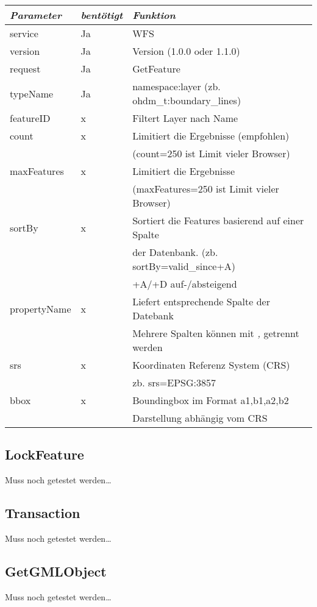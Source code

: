 \begin{tabular}{lll}
\emph{Parameter} & \emph{bentötigt} & \emph{Funktion} \\
\hline
service	& Ja & 	 WFS\\
\hline
version	& Ja &	 Version (1.0.0 oder 1.1.0)\\
\hline
request	& Ja &	GetFeature\\
\hline
typeName	& Ja &	namespace:layer (zb. ohdm\_t:boundary\_lines)\\
\hline
featureID & x & Filtert Layer nach Name\\
\hline
count & x & Limitiert die Ergebnisse (empfohlen)\\&& (count=250 ist Limit vieler Browser)\\
\hline
maxFeatures & x & Limitiert die Ergebnisse \\&&(maxFeatures=250 ist Limit vieler Browser)\\
\hline
sortBy & x & Sortiert die Features basierend auf einer Spalte \\&&der Datenbank. (zb. sortBy=valid\_since+A)\\&& +A/+D auf-/absteigend\\
\hline
propertyName & x & Liefert entsprechende Spalte der Datebank\\&&Mehrere Spalten können mit \emph{,} getrennt werden\\
\hline
srs & x & Koordinaten Referenz System (CRS)\\&& zb. srs=EPSG:3857\\
\hline
bbox & x& Boundingbox im Format a1,b1,a2,b2\\&& Darstellung abhängig vom CRS\\
\end{tabular}

\subsection*{LockFeature}
Muss noch getestet werden\ldots
\subsection*{Transaction}
Muss noch getestet werden\ldots
\subsection*{GetGMLObject}
Muss noch getestet werden\ldots
